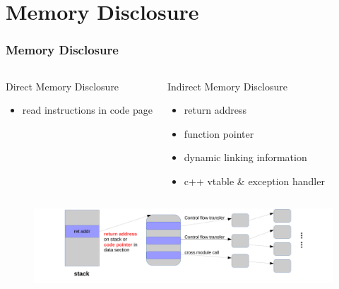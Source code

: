 \documentclass[aspectratio=169]{beamer}
\begin{document}
\section{Memory Disclosure}
\begin{frame}
\frametitle{Memory Disclosure}
\begin{columns}[t]
\begin{center}
Direct Memory Disclosure
\begin{itemize}
\item read instructions in code page
\end{itemize}
\end{center}
\begin{center}
Indirect Memory Disclosure
\begin{itemize}
\item return address
\item function pointer
\item dynamic linking information
\item c++ vtable \& exception handler
\end{itemize}
\end{center}
\end{columns}
\begin{figure}
\includegraphics[width=1.0\linewidth]{figures/disclosure.pdf}
\end{figure}
\end{frame}

\end{document}
